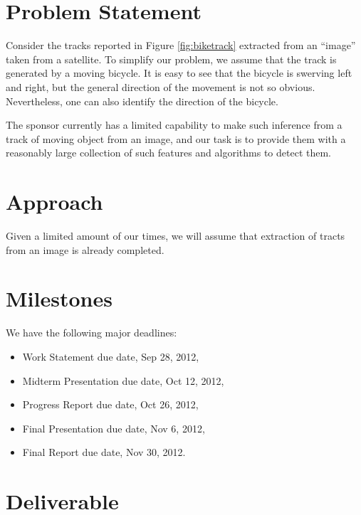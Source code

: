 \documentclass[12pt,letterpaper]{article}
\theoremstyle{definition}
\begin{document}
\section{Problem Statement}
Consider the tracks reported in Figure \ref{fig:biketrack} extracted from an
``image'' taken from a satellite. 
To simplify our problem, we assume that the track is generated by a moving 
bicycle.  It is easy to see that the bicycle is swerving left and right,
but the general direction of the movement is not so obvious.  Nevertheless,
one can also identify the direction of the bicycle. 

The sponsor currently has a limited capability to make such inference from a
track of moving object from an image, and our task is to provide them with 
a reasonably large collection of such features and algorithms to detect them. 

\section{Approach}
Given a limited amount of our times, we will assume that extraction of 
tracts from an image is already completed.   
\section{Milestones}
We have the following major deadlines:
\begin{itemize}
    \item Work Statement due date, Sep 28, 2012,
    \item Midterm Presentation due date, Oct 12, 2012,
    \item Progress Report due date, Oct 26, 2012,
    \item Final Presentation due date, Nov 6, 2012,
    \item Final Report due date, Nov 30, 2012.
\end{itemize}

\section{Deliverable}
\end{document}

